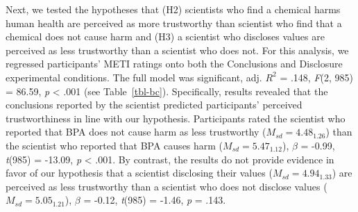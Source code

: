 \documentclass[
  letterpaper,
  DIV=11,
  numbers=noendperiod]{scrartcl}
\begin{document}
Next, we tested the hypotheses that (H2) scientists who find a chemical
harms human health are perceived as more trustworthy than scientist who
find that a chemical does not cause harm and (H3) a scientist who
discloses values are perceived as less trustworthy than a scientist who
does not. For this analysis, we regressed participants' METI ratings
onto both the Conclusions and Disclosure experimental conditions. The
full model was significant, adj. \(R^2\) = .148, \emph{F}(2, 985) =
86.59, \emph{p} \textless{} .001 (see Table~\ref{tbl-bc}). Specifically,
results revealed that the conclusions reported by the scientist
predicted participants' perceived trustworthiness in line with our
hypothesis. Participants rated the scientist who reported that BPA does
not cause harm as less trustworthy (\(M_{sd} = 4.48_{1.26}\)) than the
scientist who reported that BPA causes harm (\(M_{sd} = 5.47_{1.12}\)),
\(\beta\) = -0.99, \emph{t}(985) = -13.09, \emph{p} \textless{} .001. By
contrast, the results do not provide evidence in favor of our hypothesis
that a scientist disclosing their values (\(M_{sd} = 4.94_{1.33}\)) are
perceived as less trustworthy than a scientist who does not disclose
values (\(M_{sd} = 5.05_{1.21}\)), \(\beta\) = -0.12, \emph{t}(985) =
-1.46, \emph{p} = .143.

\hypertarget{tbl-bc}{}
\begin{table}
\caption{\label{tbl-bc}Regression analysis for hypotheses H2 (consumer risk sensitivity) and H3
(disclosure effect) }\tabularnewline

\centering
{}
\end{table}
\end{document}
